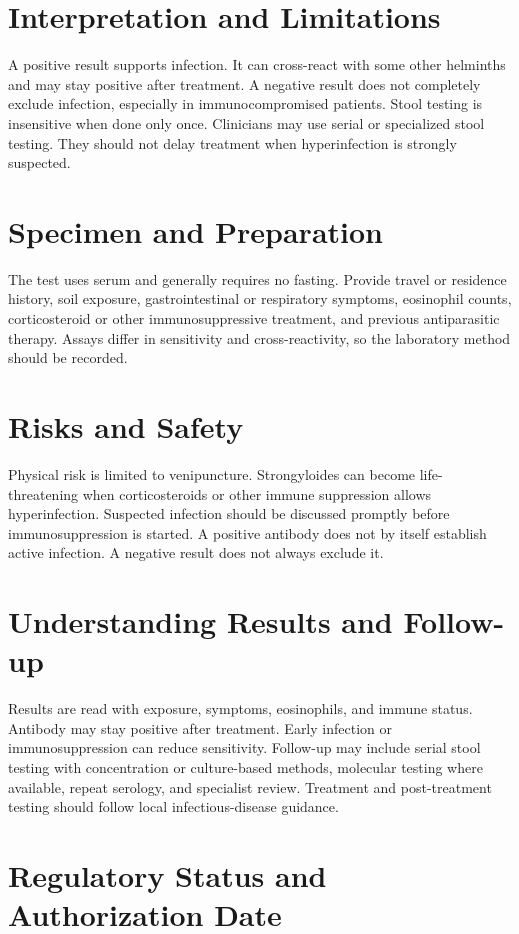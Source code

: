 \section*{Interpretation and Limitations}
A positive result supports infection. It can cross-react with some other helminths and may stay positive after treatment. A negative result does not completely exclude infection, especially in immunocompromised patients. Stool testing is insensitive when done only once. Clinicians may use serial or specialized stool testing. They should not delay treatment when hyperinfection is strongly suspected.
\section*{Specimen and Preparation}
The test uses serum and generally requires no fasting. Provide travel or residence history, soil exposure, gastrointestinal or respiratory symptoms, eosinophil counts, corticosteroid or other immunosuppressive treatment, and previous antiparasitic therapy. Assays differ in sensitivity and cross-reactivity, so the laboratory method should be recorded.

\section*{Risks and Safety}
Physical risk is limited to venipuncture. Strongyloides can become life-threatening when corticosteroids or other immune suppression allows hyperinfection. Suspected infection should be discussed promptly before immunosuppression is started. A positive antibody does not by itself establish active infection. A negative result does not always exclude it.

\section*{Understanding Results and Follow-up}
Results are read with exposure, symptoms, eosinophils, and immune status. Antibody may stay positive after treatment. Early infection or immunosuppression can reduce sensitivity. Follow-up may include serial stool testing with concentration or culture-based methods, molecular testing where available, repeat serology, and specialist review. Treatment and post-treatment testing should follow local infectious-disease guidance.

\section*{Regulatory Status and Authorization Date}

\clearpage
